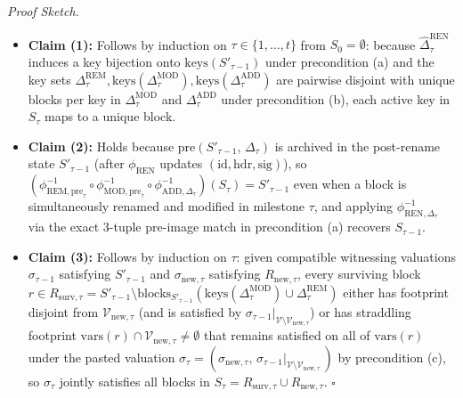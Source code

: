 \documentclass[11pt,a4paper,copyright]{google}
\begin{document}
\textit{Proof Sketch.}
\begin{itemize}[leftmargin=1.5em,itemsep=1.5pt,topsep=2pt]
  \item \textbf{Claim (1):} Follows by induction on $\tau \in \{1, \dots, t\}$ from $S_0 = \emptyset$: because $\hat{\Delta}_\tau^{\text{REN}}$ induces a key bijection onto $\text{keys}(S'_{\tau-1})$ under precondition (a) and the key sets $\Delta_\tau^{\text{REM}}, \text{keys}(\Delta_\tau^{\text{MOD}}), \text{keys}(\Delta_\tau^{\text{ADD}})$ are pairwise disjoint with unique blocks per key in $\Delta_\tau^{\text{MOD}}$ and $\Delta_\tau^{\text{ADD}}$ under precondition (b), each active key in $S_\tau$ maps to a unique block.
  \item \textbf{Claim (2):} Holds because $\text{pre}(S'_{\tau-1},\, \Delta_\tau)$ is archived in the post-rename state $S'_{\tau-1}$ (after $\phi_{\text{REN}}$ updates $(\text{id}, \text{hdr}, \text{sig})$), so $(\phi_{\text{REM},\text{pre}_\tau}^{-1} \circ \phi_{\text{MOD},\text{pre}_\tau}^{-1} \circ \phi_{\text{ADD},\Delta_\tau}^{-1})(S_\tau) = S'_{\tau-1}$ even when a block is simultaneously renamed and modified in milestone $\tau$, and applying $\phi_{\text{REN},\Delta_\tau}^{-1}$ via the exact 3-tuple pre-image match in precondition (a) recovers $S_{\tau-1}$.
  \item \textbf{Claim (3):} Follows by induction on $\tau$: given compatible witnessing valuations $\sigma_{\tau-1}$ satisfying $S'_{\tau-1}$ and $\sigma_{\text{new},\tau}$ satisfying $R_{\text{new},\tau}$, every surviving block $r \in R_{\text{surv},\tau} = S'_{\tau-1} \setminus \text{blocks}_{S'_{\tau-1}}(\text{keys}(\Delta_\tau^{\text{MOD}}) \cup \Delta_\tau^{\text{REM}})$ either has footprint disjoint from $\mathcal{V}_{\text{new},\tau}$ (and is satisfied by $\sigma_{\tau-1}|_{\mathcal{V} \setminus \mathcal{V}_{\text{new},\tau}}$) or has straddling footprint $\text{vars}(r) \cap \mathcal{V}_{\text{new},\tau} \neq \emptyset$ that remains satisfied on all of $\text{vars}(r)$ under the pasted valuation $\sigma_\tau = (\sigma_{\text{new},\tau},\, \sigma_{\tau-1}|_{\mathcal{V} \setminus \mathcal{V}_{\text{new},\tau}}\,)$ by precondition (c), so $\sigma_\tau$ jointly satisfies all blocks in $S_\tau = R_{\text{surv},\tau} \cup R_{\text{new},\tau}$. $\square$
\end{itemize}
\end{document}
